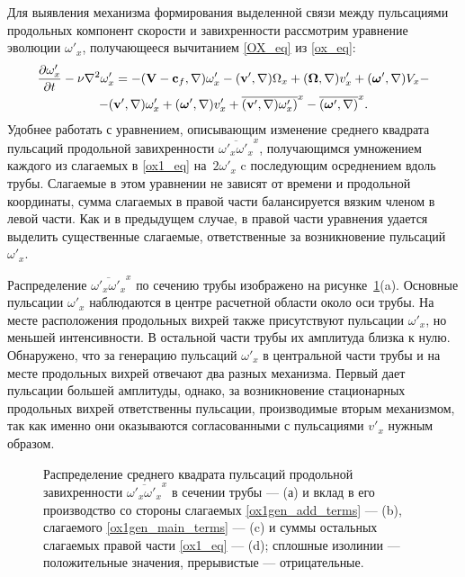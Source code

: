 Для выявления механизма формирования выделенной связи между пульсациями продольных компонент скорости и завихренности рассмотрим уравнение эволюции $\omega'_x$, получающееся вычитанием \eqref{OX_eq} из \eqref{ox_eq}:
\begin{multline}\label{ox1_eq}
\frac{\partial \omega'_x}{\partial t} - \nu \nabla^2 \omega'_x = - (\mathbf{V} - \mathbf{c}_f, \nabla) \omega'_x - (\mathbf{v}', \nabla) \Omega_x
+(\mbox{\boldmath$\Omega$}, \nabla) v'_x + (\mbox{\boldmath$\omega$}', \nabla) V_x -\\- (\mathbf{v}', \nabla) \omega'_x  + (\mbox{\boldmath$\omega$}', \nabla) v'_x  + \overline{(\mathbf{v}', \nabla) \omega'_x)}^x  - \overline{(\mbox{\boldmath$\omega$}', \nabla)}^x.
\end{multline}
Удобнее работать с уравнением, описывающим изменение среднего квадрата пульсаций продольной завихренности $\overline{\omega'_x\omega'_x}^x$, получающимся умножением каждого из слагаемых в \eqref{ox1_eq} на~$2\omega'_x$ c последующим осреднением вдоль трубы. Слагаемые в этом уравнении не зависят от времени и продольной координаты, сумма слагаемых в правой части балансируется вязким членом в левой части. Как и в предыдущем случае, в правой части уравнения удается выделить существенные слагаемые, ответственные за возникновение пульсаций~$\omega'_x$.


Распределение $\overline{\omega'_x \omega'_x}^x$ по сечению трубы изображено на рисунке~\ref{ox1gen_pic}(a). Основные пульсации $\omega'_x$ наблюдаются в центре расчетной области около оси трубы. На месте расположения продольных вихрей также присутствуют пульсации $\omega'_x$, но меньшей интенсивности. В остальной части трубы их амплитуда близка к нулю. Обнаружено, что за генерацию пульсаций $\omega'_x$ в центральной части трубы и на месте продольных вихрей отвечают два разных механизма. Первый дает пульсации большей амплитуды, однако, за возникновение стационарных продольных вихрей ответственны пульсации, производимые вторым механизмом, так как именно они оказываются согласованными с пульсациями $v'_x$ нужным образом.


\begin{figure}
\caption{Распределение среднего квадрата пульсаций продольной завихренности $\overline{\omega'_x \omega'_x }^x$ в сечении трубы --- (а) и вклад в его производство со стороны слагаемых \eqref{ox1gen_add_terms} --- (b), слагаемого \eqref{ox1gen_main_terms} --- (c) и суммы остальных слагаемых правой части \eqref{ox1_eq} --- (d); сплошные изолинии --- положительные значения, прерывистые --- отрицательные.}
\label{ox1gen_pic}
\end{figure}


